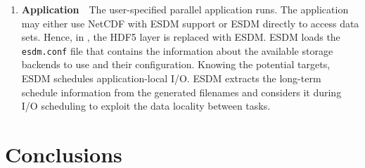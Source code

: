 \documentclass[a4paper]{article}
\begin{document}
\begin{enumerate}
  \item \textbf{Application}\ \ The user-specified parallel application runs.
  The application may either use NetCDF with ESDM support or ESDM directly to access data sets.
  Hence, in , the HDF5 layer is replaced with ESDM.
  ESDM loads the \texttt{esdm.conf} file that contains the information about the available storage backends to use and their configuration.
  Knowing the potential targets, ESDM schedules application-local I/O.
  ESDM extracts the long-term schedule information from the generated filenames and considers it during I/O scheduling to exploit the data locality between tasks.


\end{enumerate}



\section{Conclusions}
\label{sec:conclusions}

\end{document}
